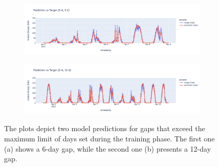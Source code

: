 

\begin{figure}[H]
	\centering
	\begin{subfigure}{\textwidth}
		\centering
		\includegraphics[width=.85\textwidth]{chapters/3_models/imgs/grrun/eval/grruneval6buco.png}
		\caption{}
	\end{subfigure}
	\begin{subfigure}{\textwidth}
		\centering
		\includegraphics[width=.85\textwidth]{chapters/3_models/imgs/grrun/eval/grruneval12buco.png}
		\caption{}
	\end{subfigure}
	\caption{The plots depict two model predictions for gaps that exceed the maximum limit of days set during the training phase. The first one (a) shows a 6-day gap, while the second one (b) presents a 12-day gap.}
	\label{fig:grrunevalbucogrande}
\end{figure}

